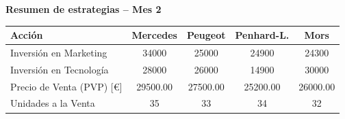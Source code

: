 \documentclass{standalone}
\begin{document}
	\leavevmode
	
	\begin{minipage}{1.02\linewidth}
		\centering
		
		\textbf{Resumen de estrategias – Mes 2}\\[0.5em]
		\begin{tabular}{@{}l
				S[table-format=5.0]
				S[table-format=5.0]
				S[table-format=5.0]
				S[table-format=5.0]@{}}
			\toprule
			\textbf{Acción} & \textbf{Mercedes} & \textbf{Peugeot} & \textbf{Penhard-L.} & \textbf{Mors} \\
			\midrule
			Inversión en Marketing              & 34000  & 25000  & 24900  & 24300 \\
			Inversión en Tecnología             & 28000  & 26000  & 14900  & 30000 \\
			Precio de Venta (PVP) [\euro]       & 29500.00 & 27500.00 & 25200.00 & 26000.00 \\
			Unidades a la Venta                 & 35     & 33     & 34     & 32 \\
			\bottomrule
		\end{tabular}
	\end{minipage}
	
\end{document}
